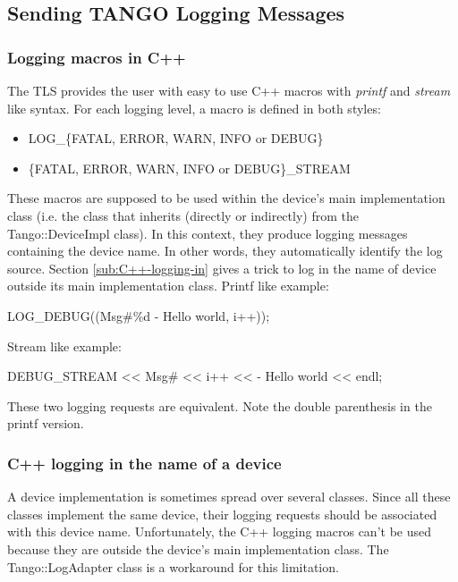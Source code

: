 \subsection{Sending TANGO Logging Messages}


\subsubsection{Logging macros in C++}

The TLS provides the user with easy to use C++ macros with \emph{printf}
and \emph{stream} like syntax. For each logging level, a macro is
defined in both styles:
\begin{itemize}
\item LOG\_\{FATAL, ERROR, WARN, INFO or DEBUG\}
\item \{FATAL, ERROR, WARN, INFO or DEBUG\}\_STREAM
\end{itemize}
These macros are supposed to be used within the device's main implementation
class (i.e. the class that inherits (directly or indirectly) from
the Tango::DeviceImpl class). In this context, they produce logging
messages containing the device name. In other words, they automatically
identify the log source. Section \ref{sub:C++-logging-in} gives a
trick to log in the name of device outside its main implementation
class. Printf like example:



LOG\_DEBUG((\textquotedbl{}Msg\#\%d - Hello world\textquotedbl{},
i++));



Stream like example:



DEBUG\_STREAM <\textcompwordmark{}< \textquotedbl{}Msg\#\textquotedbl{}
<\textcompwordmark{}< i++ <\textcompwordmark{}< \textquotedbl{}- Hello
world\textquotedbl{} <\textcompwordmark{}< endl;   



These two logging requests are equivalent. Note the double parenthesis
in the printf version.


\subsubsection{C++ logging in the name of a device\label{sub:C++-logging-in}}

A device implementation is sometimes spread over several classes.
Since all these classes implement the same device, their logging requests
should be associated with this device name. Unfortunately, the C++
logging macros can't be used because they are outside the device's
main implementation class. The Tango::LogAdapter class is a workaround
for this limitation.

